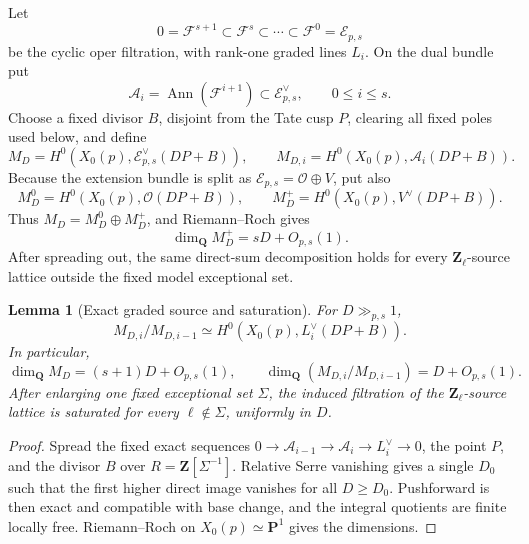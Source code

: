 \documentclass[11pt]{article}
\newtheorem{lemma}[lemma]{Lemma}
\theoremstyle{definition}
\theoremstyle{remark}
\newcommand{\Q}{\mathbf Q}
\newcommand{\Z}{\mathbf Z}
\newcommand{\Ann}{\operatorname{Ann}}
\newcommand{\calE}{\mathcal E}
\newcommand{\calF}{\mathcal F}
\newcommand{\calA}{\mathcal A}
\newcommand{\calO}{\mathcal O}
\begin{document}
Let
\[
 0=\calF^{s+1}\subset\calF^s\subset\cdots\subset\calF^0=\calE_{p,s}
\]
be the cyclic oper filtration, with rank-one graded lines $L_i$.  On the dual
bundle put
\[
 \calA_i=\Ann(\calF^{i+1})\subset\calE_{p,s}^\vee,
 \qquad0\le i\le s.
\]
Choose a fixed divisor $B$, disjoint from the Tate cusp $P$, clearing all
fixed poles used below, and define
\begin{equation}\label{eq:source-MD}
 M_D=H^0\left(X_0(p),\calE_{p,s}^\vee(DP+B)\right),
 \qquad
 M_{D,i}=H^0\left(X_0(p),\calA_i(DP+B)\right).
\end{equation}
Because the extension bundle is split as
$\calE_{p,s}=\calO\oplus V$, put also
\begin{equation}\label{eq:source-split}
 M_D^0=H^0\left(X_0(p),\calO(DP+B)\right),
 \qquad
 M_D^+=H^0\left(X_0(p),V^\vee(DP+B)\right).
\end{equation}
Thus $M_D=M_D^0\oplus M_D^+$, and Riemann--Roch gives
\begin{equation}\label{eq:positive-source-rank}
 \dim_\Q M_D^+=sD+O_{p,s}(1).
\end{equation}
After spreading out, the same direct-sum decomposition holds for every
$\Z_\ell$-source lattice outside the fixed model exceptional set.

\begin{lemma}[Exact graded source and saturation]\label{lem:graded-source}
For $D\gg_{p,s}1$,
\[
 M_{D,i}/M_{D,i-1}
 \simeq H^0\left(X_0(p),L_i^\vee(DP+B)\right).
\]
In particular,
\[
 \dim_\Q M_D=(s+1)D+O_{p,s}(1),
 \qquad
 \dim_\Q(M_{D,i}/M_{D,i-1})=D+O_{p,s}(1).
\]
After enlarging one fixed exceptional set $\Sigma$, the induced filtration of
the $\Z_\ell$-source lattice is saturated for every $\ell\notin\Sigma$,
uniformly in $D$.
\end{lemma}

\begin{proof}
Spread the fixed exact sequences
$0\to\calA_{i-1}\to\calA_i\to L_i^\vee\to0$, the point $P$, and the
divisor $B$ over $R=\Z[\Sigma^{-1}]$.  Relative Serre vanishing gives a
single $D_0$ such that the first higher direct image vanishes for all
$D\ge D_0$.  Pushforward is then exact and compatible with base change, and
the integral quotients are finite locally free.  Riemann--Roch on
$X_0(p)\simeq\mathbf P^1$ gives the dimensions.
\end{proof}
\end{document}
